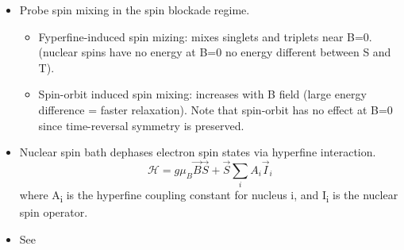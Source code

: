 \begin{itemize}
          \begin{itemize}
              \item Spin-Orbit interaction
              \item Hyperfine interaction
              \item Spin-orbit + phonons = spin relaxation
              \item Dephasing (10-100ns timescale)
          \end{itemize}
    \item Probe spin mixing in the spin blockade regime.
          \begin{itemize}
              \item Fyperfine-induced spin mizing: mixes singlets and triplets near B=0. (nuclear spins have no energy at B=0 no energy different between S and T).
              \item Spin-orbit induced spin mixing: increases with B field (large energy difference = faster relaxation). Note that spin-orbit has no effect at B=0 since time-reversal symmetry is preserved.
          \end{itemize}
    \item Nuclear spin bath dephases electron spin states via hyperfine interaction.
          \begin{equation}
              \mathcal{H} = g \mu_B \vec{B} \vec{S} + \vec{S} \sum_i A_i \vec{I}_i
          \end{equation}
          where A\textsubscript{i} is the hyperfine coupling constant for nucleus i, and I\textsubscript{i} is the nuclear spin operator.
    \item See \parencite{Khaetskii2002, Merkulov2002}
\end{itemize}

